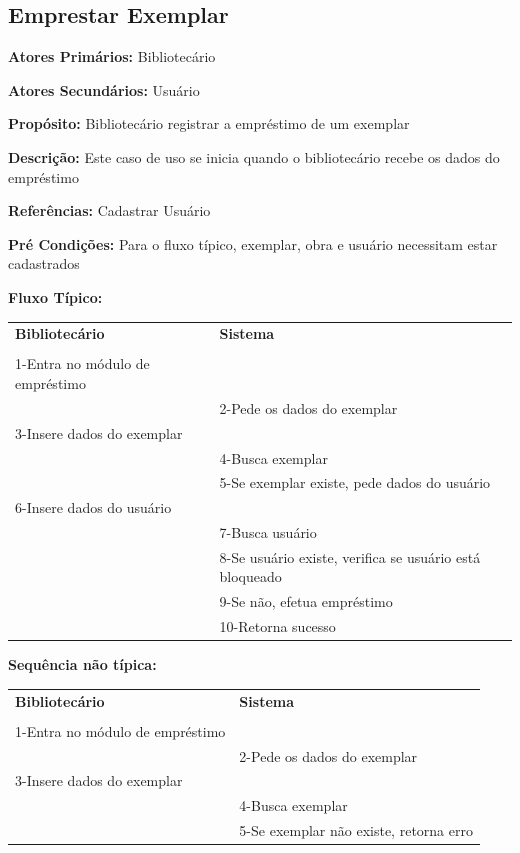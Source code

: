 \documentclass[
	12pt,				%
	openright,			%
	oneside,			%
	a4paper,			%
	english,			%
	brazil				%
	]{abntex2}
\begin{document}
\subsection{Emprestar Exemplar}

\textbf{Atores Primários:} Bibliotecário

\textbf{Atores Secundários:} Usuário

\textbf{Propósito:}      Bibliotecário registrar a empréstimo de um exemplar

\textbf{Descrição:}      Este caso de uso se inicia quando o bibliotecário recebe os dados do empréstimo

\textbf{Referências:}  Cadastrar Usuário

\textbf{Pré Condições:} Para o fluxo típico, exemplar, obra e usuário necessitam estar cadastrados

\textbf{Fluxo Típico:} 

\begin{table}[H]
\ABNTEXfontereduzida
\begin{center}
\begin{tabular}{p{5.5cm} p{5.5cm}}
    \textbf{Bibliotecário} & \textbf{Sistema}\\
     & \\
    1-Entra no módulo de empréstimo & \\
     & 2-Pede os dados do exemplar\\
    3-Insere dados do exemplar & \\
     & 4-Busca exemplar\\
     & 5-Se exemplar existe, pede dados do usuário\\
    6-Insere dados do usuário & \\
     & 7-Busca usuário\\
     & 8-Se usuário existe, verifica se usuário está bloqueado\\
     & 9-Se não, efetua empréstimo\\
     & 10-Retorna sucesso
\end{tabular}
\end{center}
\end{table} 

\textbf{Sequência não típica:}

\begin{table}[H]
\ABNTEXfontereduzida
\begin{center}
\begin{tabular}{p{5.5cm} p{5.5cm}}
    \textbf{Bibliotecário} & \textbf{Sistema}\\
     & \\
    1-Entra no módulo de empréstimo & \\
     & 2-Pede os dados do exemplar\\
    3-Insere dados do exemplar & \\
     & 4-Busca exemplar\\
     & 5-Se exemplar não existe, retorna erro\\
\end{tabular}
\end{center}
\end{table}
            
\end{document}
